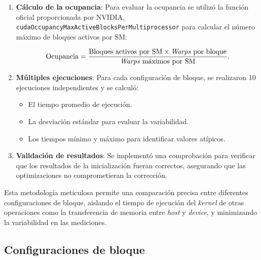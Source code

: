 \begin{enumerate}
            \item \textbf{Cálculo de la ocupancia}: Para evaluar la ocupancia se utilizó la función oficial proporcionada por NVIDIA, \texttt{cudaOccupancyMaxActiveBlocksPerMultiprocessor} para calcular el número máximo de bloques activos por SM:
                
                \begin{align*}
                    \text{Ocupancia} = \frac{\text{Bloques activos por SM} \times \text{\textit{Warps} por bloque}}{\text{\textit{Warps} máximos por SM}}.
                \end{align*}
            
            \item \textbf{Múltiples ejecuciones}: Para cada configuración de bloque, se realizaron 10 ejecuciones independientes y se calculó:
                
                \begin{itemize}
                
                    \item El tiempo promedio de ejecución.
                    
                    \item La desviación estándar para evaluar la variabilidad.
                    
                    \item Los tiempos mínimo y máximo para identificar valores atípicos.
                    
                \end{itemize}
            
            \item \textbf{Validación de resultados}: Se implementó una comprobación para verificar que los resultados de la inicialización fueran correctos, asegurando que las optimizaciones no comprometieran la corrección.
       
        \end{enumerate}
        
        Esta metodología meticulosa permite una comparación precisa entre diferentes configuraciones de bloque, aislando el tiempo de ejecución del \textit{kernel} de otras operaciones como la transferencia de memoria entre \textit{host} y \textit{device}, y minimizando la variabilidad en las mediciones.
    
    \subsection{Configuraciones de bloque}
    
